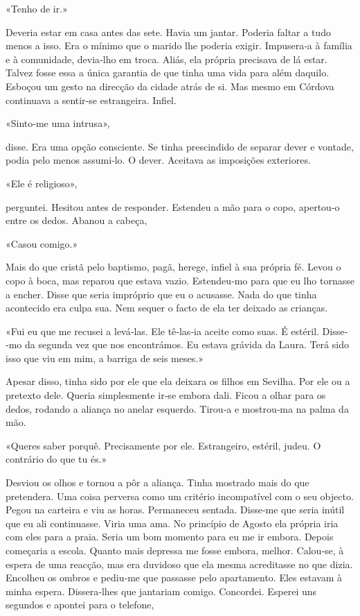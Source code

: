 «Tenho de ir.»

Deveria estar em casa antes das sete. Havia um jantar. Poderia faltar a
tudo menos a isso. Era o mínimo que o marido lhe poderia exigir.
Impusera­‑a à família e à comunidade, devia­‑lho em troca. Aliás, ela
própria precisava de lá estar. Talvez fosse essa a única garantia de que
tinha uma vida para além daquilo. Esboçou um gesto na direcção da cidade
atrás de si. Mas mesmo em Córdova continuava a sentir­‑se estrangeira.
Infiel.

«Sinto­‑me uma intrusa»,

disse. Era uma opção consciente. Se tinha prescindido de separar dever e
vontade, podia pelo menos assumi­‑lo. O dever. Aceitava as imposições
exteriores.

«Ele é religioso»,

perguntei. Hesitou antes de responder. Estendeu a mão para o copo,
apertou­‑o entre os dedos. Abanou a cabeça,

«Casou comigo.»

Mais do que cristã pelo baptismo, pagã, herege, infiel à sua própria fé.
Levou o copo à boca, mas reparou que estava vazio. Estendeu­‑mo para que
eu lho tornasse a encher. Disse que seria impróprio que eu o acusasse.
Nada do que tinha acontecido era culpa sua. Nem sequer o facto de ela
ter deixado as crianças.

«Fui eu que me recusei a levá­‑las. Ele tê­‑las­‑ia aceite como suas. É
estéril. Disse­‑mo da segunda vez que nos encontrámos. Eu estava grávida
da Laura. Terá sido isso que viu em mim, a barriga de seis meses.»

Apesar disso, tinha sido por ele que ela deixara os filhos em Sevilha.
Por ele ou a pretexto dele. Queria simplesmente ir­‑se embora dali.
Ficou a olhar para os dedos, rodando a aliança no anelar esquerdo.
Tirou­‑a e mostrou­‑ma na palma da mão.

«Queres saber porquê. Precisamente por ele. Estrangeiro, estéril, judeu.
O contrário do que tu és.»

Desviou os olhos e tornou a pôr a aliança. Tinha mostrado mais do que
pretendera. Uma coisa perversa como um critério incompatível com o seu
objecto. Pegou na carteira e viu as horas. Permaneceu sentada. Disse­‑me
que seria inútil que eu ali continuasse. Viria uma ama. No princípio de
Agosto ela própria iria com eles para a praia. Seria um bom momento para
eu me ir embora. Depois começaria a escola. Quanto mais depressa me
fosse embora, melhor. Calou­‑se, à espera de uma reacção, mas era
duvidoso que ela mesma acreditasse no que dizia. Encolheu os ombros e
pediu­‑me que passasse pelo apartamento. Eles estavam à minha espera.
Dissera­‑lhes que jantariam comigo. Concordei. Esperei uns segundos e
apontei para o telefone,

